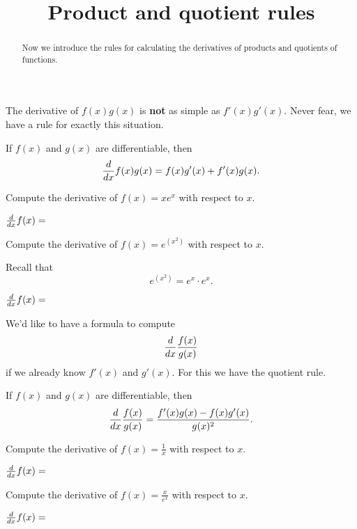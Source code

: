 \documentclass{ximera}
\title{Product and quotient rules}
\begin{document}
\begin{abstract}
  Now we introduce the rules for calculating the derivatives of
  products and quotients of functions.
\end{abstract}
\maketitle

The derivative of $f(x)g(x)$ is \textbf{not} as simple as
$f'(x)g'(x)$. Never fear, we have a rule for exactly this situation.

\begin{theorem}
If $f(x)$ and $g(x)$ are differentiable, then
\[
\frac{d}{dx} f(x)g(x) = f(x)g'(x)+f'(x)g(x).
\]
\end{theorem}


\begin{question}
  Compute the derivative of $f(x) = xe^x$ with respect to $x$.  
\begin{prompt}
$\frac{d}{dx} f(x) = $
\end{prompt}  
\end{question}

\begin{question}
  Compute the derivative of $f(x) = e^{\left(x^2\right)}$ with respect to $x$.  
\begin{hint} 
Recall that 
\[
e^{\left(x^2\right)} = e^x \cdot e^x.
\]
\end{hint}
\begin{prompt}
$\frac{d}{dx} f(x) = $
\end{prompt}  
\end{question}

We'd like to have a formula to compute
\[
\frac{d}{dx} \frac{f(x)}{g(x)}
\]
if we already know $f'(x)$ and $g'(x)$. For this we have the quotient
rule.

\begin{theorem}
If $f(x)$ and $g(x)$ are differentiable, then
\[
\frac{d}{dx} \frac{f(x)}{g(x)} = \frac{f'(x)g(x)-f(x)g'(x)}{g(x)^2}.
\]
\end{theorem}

\begin{question}
  Compute the derivative of $f(x) = \frac{1}{x}$ with respect to $x$.  
\begin{prompt}
$\frac{d}{dx} f(x) = $
\end{prompt}  
\end{question}


\begin{question}
  Compute the derivative of $f(x) = \frac{x}{e^x}$ with respect to $x$.  
\begin{prompt}
$\frac{d}{dx} f(x) = $
\end{prompt}  
\end{question}
\end{document}

